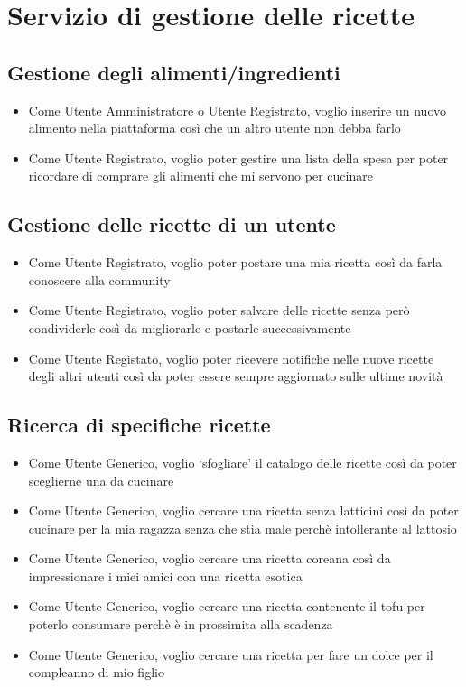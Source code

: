 \documentclass{article}
\begin{document}
\section{Servizio di gestione delle ricette}
\subsection{Gestione degli alimenti/ingredienti}
\begin{itemize}
    \item Come Utente Amministratore o Utente Registrato, voglio inserire un nuovo alimento nella piattaforma 
    così che un altro utente non debba farlo
    \item Come Utente Registrato, voglio poter gestire una lista della spesa per poter ricordare di comprare 
    gli alimenti che mi servono per cucinare
\end{itemize}

\subsection{Gestione delle ricette di un utente}
\begin{itemize}
    \item Come Utente Registrato, voglio poter postare una mia ricetta così da farla conoscere alla community 
    \item Come Utente Registrato, voglio poter salvare delle ricette senza però condividerle così da migliorarle 
    e postarle successivamente
    \item Come Utente Registato, voglio poter ricevere notifiche nelle nuove ricette degli altri utenti 
    così da poter essere sempre aggiornato sulle ultime novità
\end{itemize}

\subsection{Ricerca di specifiche ricette}
\begin{itemize}
    \item Come Utente Generico, voglio `sfogliare' il catalogo delle ricette così da poter sceglierne una da 
    cucinare
    \item Come Utente Generico, voglio cercare una ricetta senza latticini così da poter cucinare per la mia 
    ragazza senza che stia male perchè intollerante al lattosio
    \item Come Utente Generico, voglio cercare una ricetta coreana così da impressionare i miei amici con una
    ricetta esotica
    \item Come Utente Generico, voglio cercare una ricetta contenente il tofu per poterlo consumare perchè è 
    in prossimita alla scadenza
    \item Come Utente Generico, voglio cercare una ricetta per fare un dolce per il compleanno di mio figlio 
\end{itemize}
\end{document}

